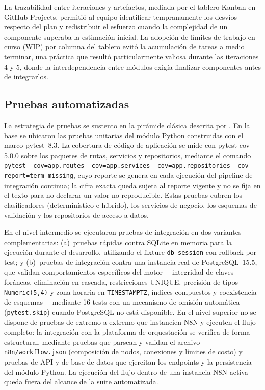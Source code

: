 La trazabilidad entre iteraciones y artefactos, mediada por el tablero Kanban en GitHub Projects, permitió al equipo identificar tempranamente los desvíos respecto del plan y redistribuir el esfuerzo cuando la complejidad de un componente superaba la estimación inicial. La adopción de límites de trabajo en curso (WIP) por columna del tablero evitó la acumulación de tareas a medio terminar, una práctica que resultó particularmente valiosa durante las iteraciones 4 y 5, donde la interdependencia entre módulos exigía finalizar componentes antes de integrarlos.

\subsection{Pruebas automatizadas}\label{subsec:pruebas-automatizadas}

La estrategia de pruebas se sustento en la pirámide clásica descrita por \textcite{Crispin2009_agile_testing}. En la base se ubicaron las pruebas unitarias del módulo Python construidas con el marco pytest~8.3. La cobertura de código de aplicación se mide con pytest-cov 5.0.0 sobre los paquetes de rutas, servicios y repositorios, mediante el comando \texttt{pytest --cov=app.routes --cov=app.services --cov=app.repositories --cov-report=term-missing}, cuyo reporte se genera en cada ejecución del pipeline de integración continua; la cifra exacta queda sujeta al reporte vigente y no se fija en el texto para no declarar un valor no reproducible. Estas pruebas cubren los clasificadores (determinístico e híbrido), los servicios de negocio, los esquemas de validación y los repositorios de acceso a datos.

En el nivel intermedio se ejecutaron pruebas de integración en dos variantes complementarias: (a)~pruebas rápidas contra SQLite en memoria para la ejecución durante el desarrollo, utilizando el fixture \texttt{db\_session} con rollback por test; y (b)~pruebas de integración contra una instancia real de PostgreSQL~15.5, que validan comportamientos específicos del motor ---integridad de claves foráneas, eliminación en cascada, restricciones UNIQUE, precisión de tipos \texttt{Numeric(5,4)} y zona horaria en \texttt{TIMESTAMPTZ}, índices compuestos y coexistencia de esquemas--- mediante 16 tests con un mecanismo de omisión automática (\texttt{pytest.skip}) cuando PostgreSQL no está disponible. En el nivel superior no se dispone de pruebas de extremo a extremo que instancien N8N y ejecuten el flujo completo: la integración con la plataforma de orquestación se verifica de forma estructural, mediante pruebas que parsean y validan el archivo \texttt{n8n/workflow.json} (composición de nodos, conexiones y límites de costo) y pruebas de API y de base de datos que ejercitan los endpoints y la persistencia del módulo Python. La ejecución del flujo dentro de una instancia N8N activa queda fuera del alcance de la suite automatizada.

